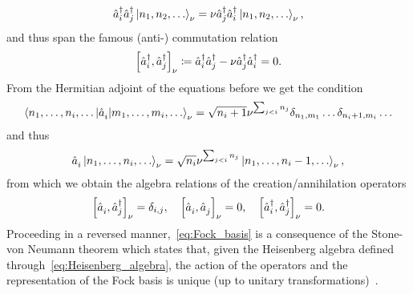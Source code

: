 \begin{align}
    \hat a^\dag_i \hat a^\dag_j\ket{n_1,n_2,\dots}_\nu = \nu \hat a^\dag_j\hat a^\dag_i\ket{n_1,n_2,\dots}_\nu,
\end{align}
and thus span the famous (anti-) commutation relation
\begin{align}
    \left[ \hat a^\dag_i, \hat a^\dag_j \right]_\nu \coloneqq \hat a^\dag_i \hat a^\dag_j - \nu \hat a^\dag_j \hat a^\dag_i = 0.
\end{align}
From the Hermitian adjoint of the equations before we get the condition
\begin{align}
   \braket{n_1,\dots,n_i,\dots | \hat a^\pdag_i | m_1, \dots, m_i,\dots}_\nu =
   \sqrt{n_i+1}\nu^{\sum_{j<i}n_j} \delta_{n_1,m_1}\dots\delta_{n_i+1,m_i}\dots
\end{align}
and thus
\begin{align}
   \hat a^\pdag_i \ket{n_1, \dots, n_i,\dots}_\nu =
   \sqrt{n_i}\nu^{\sum_{j<i}n_j} \ket{n_1, \dots, n_i-1,\dots}_\nu,
   \label{eq:annihilation}
\end{align}
from which we obtain the algebra relations of the creation/annihilation operators
\begin{align}
    \commutator{\hat a^\pdag_i,\hat a^\dag_j}_\nu = \delta_{i,j},
    \quad
    \commutator{\hat a^\pdag_i,\hat a^\pdag_j}_\nu = 0,
    \quad
    \commutator{\hat a^\dag_i,\hat a^\dag_j}_\nu = 0.
    \label{eq:Heisenberg_algebra}
\end{align}
Proceeding in a reversed manner,~\cref{eq:Fock_basis} is a consequence of the Stone-von Neumann theorem which states that, given the Heisenberg algebra defined through~\cref{eq:Heisenberg_algebra}, the action of the operators and the representation of the Fock basis is unique (up to unitary transformations)~\cite{Hall2013}.

